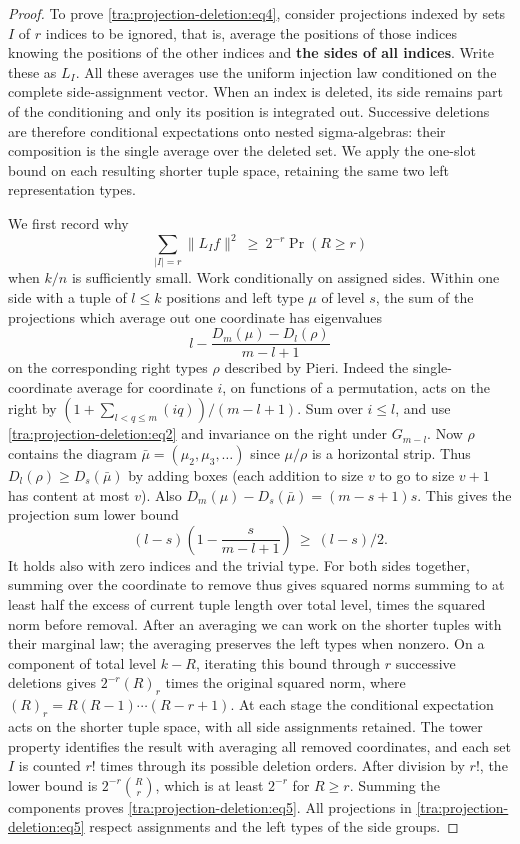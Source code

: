 \begin{proof}
To prove \eqref{tra:projection-deletion:eq4}, consider projections indexed by sets \(I\) of \(r\) indices to be ignored, that is, average the positions of those indices knowing the positions of the other indices and \textbf{the sides of all indices}. Write these as \(L_I\). All these averages use the uniform injection law conditioned on the
complete side-assignment vector. When an index is deleted, its side
remains part of the conditioning and only its position is integrated
out. Successive deletions are therefore conditional expectations onto
nested sigma-algebras: their composition is the single average over the
deleted set. We apply the one-slot bound on each resulting shorter
tuple space, retaining the same two left representation types.

We first record why
\begin{equation}
\sum_{|I|=r}\|L_I f\|^2\ \ge\ 2^{-r}\Pr(R\ge r)
\label{tra:projection-deletion:eq5}
\end{equation}
when \(k/n\) is sufficiently small. Work conditionally on assigned sides. Within one side with a tuple of \(l\le k\) positions and left type \(\mu\) of level \(s\), the sum of the projections which average out one coordinate has eigenvalues
\[
l-\frac{D_m(\mu)-D_l(\rho)}{m-l+1}
\]
on the corresponding right types \(\rho\) described by Pieri. Indeed the single-coordinate average for coordinate \(i\), on functions of a permutation, acts on the right by \((1+\sum_{l<q\le m}(iq))/(m-l+1)\). Sum over \(i\le l\), and use \eqref{tra:projection-deletion:eq2} and invariance on the right under \(G_{m-l}\). Now \(\rho\) contains the diagram \(\bar\mu=(\mu_2,\mu_3,\ldots)\) since \(\mu/\rho\) is a horizontal strip. Thus \(D_l(\rho)\ge D_s(\bar\mu)\) by adding boxes (each addition to size \(v\) to go to size \(v+1\) has content at most \(v\)). Also \(D_m(\mu)-D_s(\bar\mu)=(m-s+1)s\). This gives the projection sum lower bound
\[
(l-s)\left(1-\frac{s}{m-l+1}\right)\ \ge\ (l-s)/2.
\]
It holds also with zero indices and the trivial type. For both sides together, summing over the coordinate to remove thus gives squared norms summing to at least half the excess of current tuple length over total level, times the squared norm before removal. After an averaging we can work on the shorter tuples with their marginal law; the averaging preserves the left types when nonzero. On a component of total level $k-R$, iterating this bound through $r$ successive deletions gives $2^{-r}(R)_r$ times the original squared norm, where $(R)_r=R(R-1)\cdots(R-r+1)$. At each stage the conditional expectation acts on the shorter tuple space, with all side assignments retained. The tower property identifies the result with averaging all removed coordinates, and each set $I$ is counted $r!$ times through its possible deletion orders. After division by $r!$, the lower bound is $2^{-r}\binom Rr$, which is at least $2^{-r}$ for $R\ge r$. Summing the components proves \eqref{tra:projection-deletion:eq5}. All projections in \eqref{tra:projection-deletion:eq5} respect assignments and the left types of the side groups.


\end{proof}
